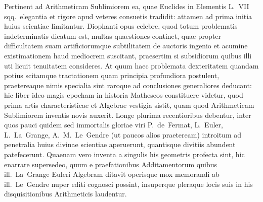 \documentclass[12pt,a4paper]{article}
\theoremstyle{plain}
\theoremstyle{definition}
\theoremstyle{remark}
\begin{document}
Pertinent ad Arithmeticam Sublimiorem ea, quae Euclides in Elementis L.\ VII sqq.\ elegantia et rigore apud veteres consuetis tradidit: attamen ad prima initia huius scientiae limitantur. Diophanti opus celebre, quod totum problematis indeterminatis dicatum est, multas quaestiones continet, quae propter difficultatem suam artificiorumque subtilitatem de auctoris ingenio et acumine existimationem haud mediocrem suscitant, praesertim si subsidiorum quibus illi uti licuit tenuitatem consideres. At quum haec problemata dexteritatem quandam potius scitamque tractationem quam principia profundiora postulent, praetereaque nimis specialia sint raroque ad conclusiones generaliores deducant: hic liber ideo magis epocham in historia Matheseos constituere videtur, quod prima artis characteristicae et Algebrae vestigia sistit, quam quod Arithmeticam Sublimiorem inventis novis auxerit. Longe plurima recentioribus debentur, inter quos pauci quidem sed immortalis gloriae viri P.~de~Fermat, L.~Euler, L.~La~Grange, A.~M.~Le~Gendre (ut paucos alios praeteream) introitum ad penetralia huius divinae scientiae aperuerunt, quantisque divitiis abundent patefecerunt. Quaenam vero inventa a singulis his geometris profecta sint, hic enarrare supersedeo, quum e praefationibus Additamentorum quibus ill.\ La~Grange Euleri Algebram ditavit operisque mox memorandi ab ill.\ Le~Gendre nuper editi cognosci possint, insuperque pleraque locis suis in his disquisitionibus Arithmeticis laudentur.
\end{document}
